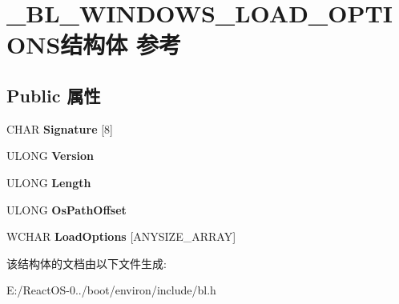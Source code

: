\hypertarget{struct___b_l___w_i_n_d_o_w_s___l_o_a_d___o_p_t_i_o_n_s}{}\section{\+\_\+\+B\+L\+\_\+\+W\+I\+N\+D\+O\+W\+S\+\_\+\+L\+O\+A\+D\+\_\+\+O\+P\+T\+I\+O\+N\+S结构体 参考}
\label{struct___b_l___w_i_n_d_o_w_s___l_o_a_d___o_p_t_i_o_n_s}
\subsection*{Public 属性}
\begin{DoxyCompactItemize}
\item 
\mbox{\label{struct___b_l___w_i_n_d_o_w_s___l_o_a_d___o_p_t_i_o_n_s_a27ce63d7a42a827af338b750c5c97b77}} 
C\+H\+AR {\bfseries Signature} \mbox{[}8\mbox{]}
\item 
\mbox{\label{struct___b_l___w_i_n_d_o_w_s___l_o_a_d___o_p_t_i_o_n_s_aefd35e82b058b33b124f02c1e5087b91}} 
U\+L\+O\+NG {\bfseries Version}
\item 
\mbox{\label{struct___b_l___w_i_n_d_o_w_s___l_o_a_d___o_p_t_i_o_n_s_a54f004f4b2cf88a28eeb1a8d7ca80fa6}} 
U\+L\+O\+NG {\bfseries Length}
\item 
\mbox{\label{struct___b_l___w_i_n_d_o_w_s___l_o_a_d___o_p_t_i_o_n_s_aac79fab97240d2b494c5d3104022dd9c}} 
U\+L\+O\+NG {\bfseries Os\+Path\+Offset}
\item 
\mbox{\label{struct___b_l___w_i_n_d_o_w_s___l_o_a_d___o_p_t_i_o_n_s_ae81fc7dfe1942ce90308e60c1d92555a}} 
W\+C\+H\+AR {\bfseries Load\+Options} \mbox{[}A\+N\+Y\+S\+I\+Z\+E\+\_\+\+A\+R\+R\+AY\mbox{]}
\end{DoxyCompactItemize}


该结构体的文档由以下文件生成\+:\begin{DoxyCompactItemize}
\item 
E\+:/\+React\+O\+S-\/0../boot/environ/include/bl.\+h\end{DoxyCompactItemize}
